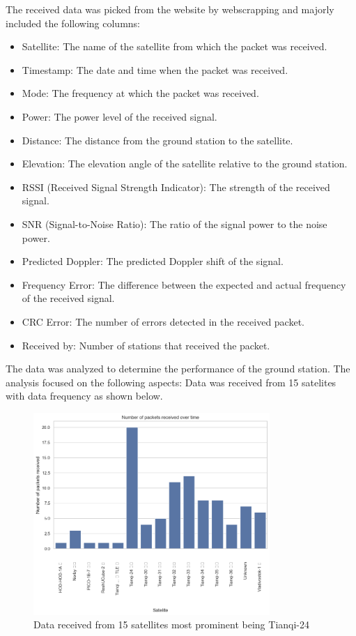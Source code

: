 \documentclass[12pt,a4paper]{article}
\begin{document}
The received data was picked from the website by webscrapping and majorly included the following columns:
\begin{itemize}
    \item Satellite: The name of the satellite from which the packet was received.
    \item Timestamp: The date and time when the packet was received.
    \item Mode: The frequency at which the packet was received.
    \item Power: The power level of the received signal.
    \item Distance: The distance from the ground station to the satellite.
    \item Elevation: The elevation angle of the satellite relative to the ground station.
    \item RSSI (Received Signal Strength Indicator): The strength of the received signal.
    \item SNR (Signal-to-Noise Ratio): The ratio of the signal power to the noise power.
    \item Predicted Doppler: The predicted Doppler shift of the signal.
    \item Frequency Error: The difference between the expected and actual frequency of the received signal.
    \item CRC Error: The number of errors detected in the received packet.
    \item Received by: Number of stations that received the packet.
\end{itemize}
The data was analyzed to determine the performance of the ground station. The analysis focused on the following aspects:
Data was received from 15 satelites with data frequency as shown below. 
\begin{figure}[h]
    \centering
    \includegraphics[width=0.8\textwidth]{../images/satelites.png}
    \caption{Data received from 15 satellites most prominent being Tianqi-24}
    \label{fig:received_data}
\end{figure}
\end{document}
